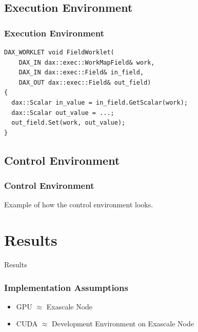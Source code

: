 \documentclass[brown]{beamer}
\newcommand\mysection[1]{
  \section{#1}
  \begin{frame}
    \begin{center}{\LARGE
      #1
      }
    \end{center}
  \end{frame}
}
\begin{document}
\subsection{Execution Environment}
\begin{frame}[fragile]
\frametitle{Execution Environment}
\begin{lstlisting}[language=Dax]
DAX_WORKLET void FieldWorklet(
    DAX_IN dax::exec::WorkMapField& work,
    DAX_IN dax::exec::Field& in_field,
    DAX_OUT dax::exec::Field& out_field)
{
  dax::Scalar in_value = in_field.GetScalar(work);
  dax::Scalar out_value = ...;
  out_field.Set(work, out_value);
}
\end{lstlisting}
\end{frame}

\subsection{Control Environment}
\frame
{
  \frametitle{Control Environment}
  Example of how the control environment looks.
}

\mysection{Results}

\frame
{
  \frametitle{Implementation Assumptions}
  \begin{itemize}
  \addtolength{\itemsep}{2\baselineskip}
  \item GPU $\approx$ Exascale Node
  \item CUDA $\approx$ Development Environment on Exascale Node
  \end{itemize}
}
\end{document}
